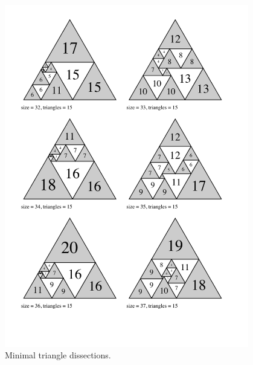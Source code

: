 \begin{figure}[htb]
\centering
\includegraphics[trim=2em 4em 3em 2em, width=0.95\textwidth]{img/tranquility6.pdf}
\caption{Minimal triangle dissections.}
\end{figure}

